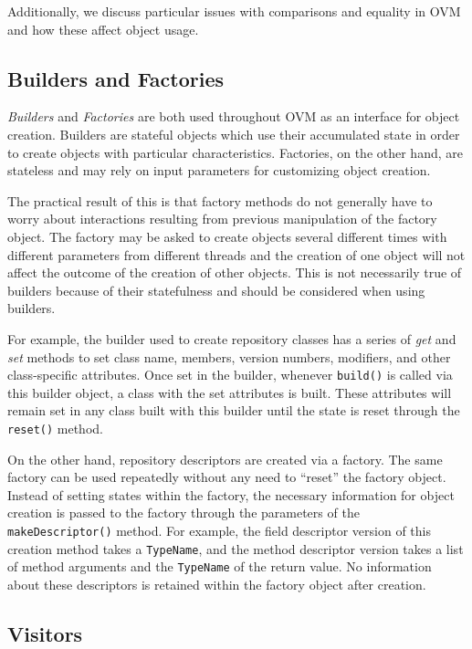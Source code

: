\documentclass{report}
\begin{document}
Additionally, we discuss particular issues with comparisons and equality
in OVM and how these affect object usage.

\subsection{Builders and Factories}

{\em Builders} and {\em Factories} are both used throughout OVM as
an interface for object creation. Builders are stateful objects which use
their accumulated state in order to create objects with particular 
characteristics. Factories, on the other hand, are stateless and may rely
on input parameters for customizing object creation. 

The practical result of this is that factory methods do not generally have
to worry about interactions resulting from previous manipulation of the factory
object. The factory may be asked to create objects several different times
with different parameters from different threads and the creation of one
object will not affect the outcome of the creation of other objects. This is
not necessarily true of builders because of their statefulness and should be
considered when using builders.

For example, the builder used to create repository classes has a series of 
{\em get} and {\em set} methods to set class name, members, version numbers,
modifiers, and other class-specific attributes. Once set in the builder,
whenever \texttt{build()} is called via this builder object, a class
with the set attributes is built. These attributes will remain set in
any class built with this builder until the state is reset through the
\texttt{reset()} method.

On the other hand, repository descriptors are created via a factory. The
same factory can be used repeatedly without any need to ``reset'' the
factory object. Instead of setting states within the factory, the necessary
information for object creation is passed to the factory through the
parameters of the \texttt{makeDescriptor()} method. For example, the
field descriptor version of this creation method takes a \texttt{TypeName}, 
and the method descriptor version takes a list of method arguments and the 
\texttt{TypeName} of the return value. No information about these descriptors
is retained within the factory object after creation.

\subsection{Visitors}\label{visitor}
\end{document}
